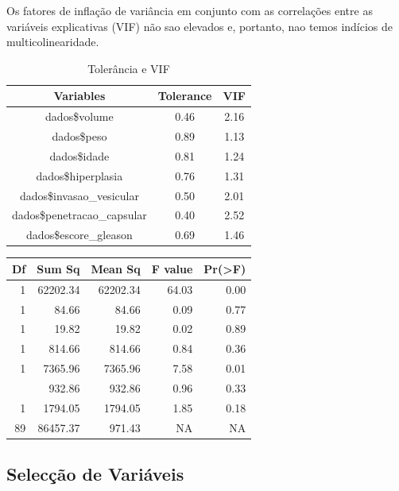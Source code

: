 \documentclass[runningheads]{llncs}\usepackage[]{graphicx}\usepackage[]{color}
\newenvironment{knitrout}{}{} %
\begin{document}
Os fatores de inflação de variância em conjunto com as correlações entre as variáveis explicativas
(VIF) não sao elevados e, portanto, nao temos indícios de multicolinearidade.
\begin{knitrout}
\color{fgcolor}\begin{table}

\caption{\label{tab:unnamed-chunk-14}Tolerância e VIF}
\centering
\begin{tabular}[t]{ccc}
\toprule
Variables & Tolerance & VIF\\
\midrule
\rowcolor{gray!6}  dados\$volume & 0.46 & 2.16\\
dados\$peso & 0.89 & 1.13\\
\rowcolor{gray!6}  dados\$idade & 0.81 & 1.24\\
dados\$hiperplasia & 0.76 & 1.31\\
\rowcolor{gray!6}  dados\$invasao\_vesicular & 0.50 & 2.01\\
\addlinespace
dados\$penetracao\_capsular & 0.40 & 2.52\\
\rowcolor{gray!6}  dados\$escore\_gleason & 0.69 & 1.46\\
\bottomrule
\end{tabular}
\end{table}

\begin{table}[H]
\centering
\begin{tabular}{rrrrr}
\toprule
Df & Sum Sq & Mean Sq & F value & Pr(>F)\\
\midrule
\rowcolor{gray!6}  1 & 62202.34 & 62202.34 & 64.03 & 0.00\\
1 & 84.66 & 84.66 & 0.09 & 0.77\\
\rowcolor{gray!6}  1 & 19.82 & 19.82 & 0.02 & 0.89\\
1 & 814.66 & 814.66 & 0.84 & 0.36\\
\rowcolor{gray!6}  1 & 7365.96 & 7365.96 & 7.58 & 0.01\\
\addlinespace
1 & 932.86 & 932.86 & 0.96 & 0.33\\
\rowcolor{gray!6}  1 & 1794.05 & 1794.05 & 1.85 & 0.18\\
89 & 86457.37 & 971.43 & NA & NA\\
\bottomrule
\end{tabular}
\end{table}


\end{knitrout}

\subsection{Selecção de Variáveis}
\end{document}
